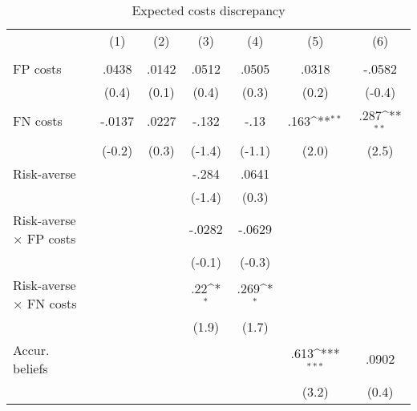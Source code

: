 \begin{table}[htbp]\centering
\def\sym#1{\ifmmode^{#1}\else\(^{#1}\)\fi}
\caption{Expected costs discrepancy}
\begin{tabular}{l*{6}{c}}
\hline\hline
                &\multicolumn{1}{c}{(1)}&\multicolumn{1}{c}{(2)}&\multicolumn{1}{c}{(3)}&\multicolumn{1}{c}{(4)}&\multicolumn{1}{c}{(5)}&\multicolumn{1}{c}{(6)}\\
                &\multicolumn{1}{c}{}&\multicolumn{1}{c}{}&\multicolumn{1}{c}{}&\multicolumn{1}{c}{}&\multicolumn{1}{c}{}&\multicolumn{1}{c}{}\\
\hline
FP costs        &    .0438         &    .0142         &    .0512         &    .0505         &    .0318         &   -.0582         \\
                &    (0.4)         &    (0.1)         &    (0.4)         &    (0.3)         &    (0.2)         &   (-0.4)         \\
FN costs        &   -.0137         &    .0227         &    -.132         &     -.13         &     .163\sym{**} &     .287\sym{**} \\
                &   (-0.2)         &    (0.3)         &   (-1.4)         &   (-1.1)         &    (2.0)         &    (2.5)         \\
Risk-averse     &                  &                  &    -.284         &    .0641         &                  &                  \\
                &                  &                  &   (-1.4)         &    (0.3)         &                  &                  \\
Risk-averse $\times$ FP costs&                  &                  &   -.0282         &   -.0629         &                  &                  \\
                &                  &                  &   (-0.1)         &   (-0.3)         &                  &                  \\
Risk-averse $\times$ FN costs&                  &                  &      .22\sym{*}  &     .269\sym{*}  &                  &                  \\
                &                  &                  &    (1.9)         &    (1.7)         &                  &                  \\
Accur. beliefs  &                  &                  &                  &                  &     .613\sym{***}&    .0902         \\
                &                  &                  &                  &                  &    (3.2)         &    (0.4)         \\

\end{tabular}
\end{table}
